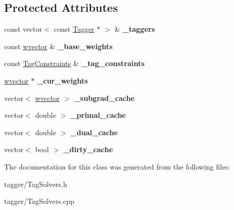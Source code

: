 \subsection*{Protected Attributes}
\begin{DoxyCompactItemize}
\item 
\hypertarget{classTaggerDual_a0068b276abb09b34ab08e9cc14947ee3}{
const vector$<$ const \hyperlink{classTagger}{Tagger} $\ast$ $>$ \& {\bfseries \_\-taggers}}
\label{classTaggerDual_a0068b276abb09b34ab08e9cc14947ee3}

\item 
\hypertarget{classTaggerDual_a0073fa0f694790d365ca959ed8386e26}{
const \hyperlink{classsvector}{wvector} \& {\bfseries \_\-base\_\-weights}}
\label{classTaggerDual_a0073fa0f694790d365ca959ed8386e26}

\item 
\hypertarget{classTaggerDual_ab8845276b234c329c967529091f51e8f}{
const \hyperlink{classTagConstraints}{TagConstraints} \& {\bfseries \_\-tag\_\-constraints}}
\label{classTaggerDual_ab8845276b234c329c967529091f51e8f}

\item 
\hypertarget{classTaggerDual_a9974a79ebf2547f3e80e9d68d06b49be}{
\hyperlink{classsvector}{wvector} $\ast$ {\bfseries \_\-cur\_\-weights}}
\label{classTaggerDual_a9974a79ebf2547f3e80e9d68d06b49be}

\item 
\hypertarget{classTaggerDual_a57232f5a7702b7715f8517d408086dbe}{
vector$<$ \hyperlink{classsvector}{wvector} $>$ {\bfseries \_\-subgrad\_\-cache}}
\label{classTaggerDual_a57232f5a7702b7715f8517d408086dbe}

\item 
\hypertarget{classTaggerDual_a47cdc599b2c73836f33aa443053e3534}{
vector$<$ double $>$ {\bfseries \_\-primal\_\-cache}}
\label{classTaggerDual_a47cdc599b2c73836f33aa443053e3534}

\item 
\hypertarget{classTaggerDual_a4472c903ae391e7cc4912bc473a9eae2}{
vector$<$ double $>$ {\bfseries \_\-dual\_\-cache}}
\label{classTaggerDual_a4472c903ae391e7cc4912bc473a9eae2}

\item 
\hypertarget{classTaggerDual_a259d5ef5c5020c75a68527950ff41310}{
vector$<$ bool $>$ {\bfseries \_\-dirty\_\-cache}}
\label{classTaggerDual_a259d5ef5c5020c75a68527950ff41310}

\end{DoxyCompactItemize}


The documentation for this class was generated from the following files:\begin{DoxyCompactItemize}
\item 
tagger/TagSolvers.h\item 
tagger/TagSolvers.cpp\end{DoxyCompactItemize}
